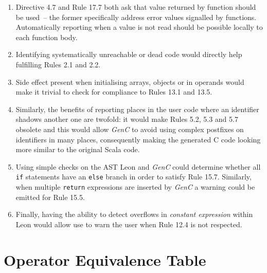 \documentclass[a4paper,twoside]{article}
\newcommand{\InlineC}[1]{\lstinline[language=C99]|#1|}
\newcommand{\InlineS}[1]{\lstinline[language=Leon]|#1|}
\let\oldsection\section
\renewcommand\section{\cleardoublepage\oldsection}
\newcommand{\GenC}{\emph{GenC}\xspace}
\begin{document}
\begin{itemize}
  \begin{enumerate}

  \item Directive 4.7 and Rule 17.7 both ask that value returned by function
  should be used~-- the former specifically address error values signalled by
  functions. Automatically reporting when a value is not read should be possible
  locally to each function body.

  \item Identifying systematically unreachable or dead code would directly help
  fulfilling Rules 2.1 and 2.2.

  \item Side effect present when initialising arrays, objects or in operands
  would make it trivial to check for compliance to Rules 13.1 and 13.5.

  \item Similarly, the benefits of reporting places in the user code where an
  identifier shadows another one are twofold: it would make Rules 5.2, 5.3 and
  5.7 obsolete and this would allow \GenC to avoid using complex postfixes on
  identifiers in many places, consequently making the generated C code looking
  more similar to the original Scala code.

  \item Using simple checks on the AST Leon and \GenC could determine whether
  all \InlineS{if} statements have an \InlineS{else} branch in order to satisfy
  Rule 15.7. Similarly, when multiple \InlineC{return} expressions are inserted
  by \GenC a warning could be emitted for Rule 15.5.

  \item Finally, having the ability to detect overflows in \emph{constant
  expression} within Leon would allow use to warn the user when Rule 12.4 is not
  respected.

  \end{enumerate}

\end{itemize}


\appendix

\section{Operator Equivalence Table}
\label{ops_checklist}

\newcommand{\VHeader}[1]{\rotatebox{90}{\textbf{#1}}}
\renewcommand{\labelitemi}{$\diamond$}
\setlength{\leftmargini}{1em}
\end{document}
